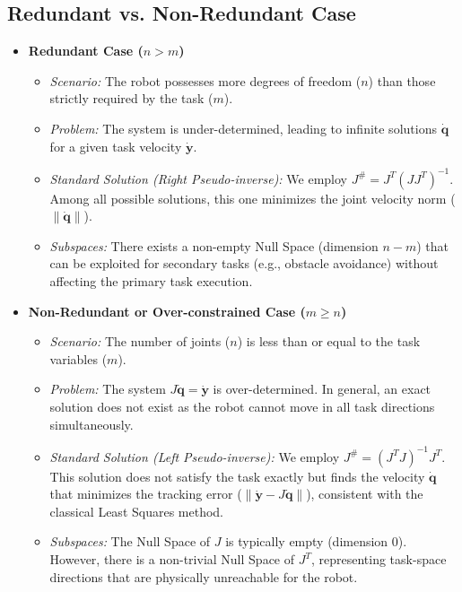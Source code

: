 \subsection{Redundant vs. Non-Redundant Case}

\begin{itemize}
    \item \textbf{Redundant Case ($n > m$)}
    \begin{itemize}
        \item \textit{Scenario:} The robot possesses more degrees of freedom ($n$) than those strictly required by the task ($m$).
        \item \textit{Problem:} The system is under-determined, leading to infinite solutions $\dot{\mathbf{q}}$ for a given task velocity $\dot{\mathbf{y}}$.
        \item \textit{Standard Solution (Right Pseudo-inverse):} We employ $J^\# = J^T(JJ^T)^{-1}$. Among all possible solutions, this one minimizes the joint velocity norm ($\|\dot{\mathbf{q}}\|$).
        \item \textit{Subspaces:} There exists a non-empty Null Space (dimension $n-m$) that can be exploited for secondary tasks (e.g., obstacle avoidance) without affecting the primary task execution.
    \end{itemize}

    \item \textbf{Non-Redundant or Over-constrained Case ($m \ge n$)}
    \begin{itemize}
        \item \textit{Scenario:} The number of joints ($n$) is less than or equal to the task variables ($m$).
        \item \textit{Problem:} The system $J\dot{\mathbf{q}} = \dot{\mathbf{y}}$ is over-determined. In general, an exact solution does not exist as the robot cannot move in all task directions simultaneously.
        \item \textit{Standard Solution (Left Pseudo-inverse):} We employ $J^\# = (J^T J)^{-1} J^T$. This solution does not satisfy the task exactly but finds the velocity $\dot{\mathbf{q}}$ that minimizes the tracking error ($\|\dot{\mathbf{y}} - J\dot{\mathbf{q}}\|$), consistent with the classical Least Squares method.
        \item \textit{Subspaces:} The Null Space of $J$ is typically empty (dimension 0). However, there is a non-trivial Null Space of $J^T$, representing task-space directions that are physically unreachable for the robot.
    \end{itemize}

\end{itemize}

